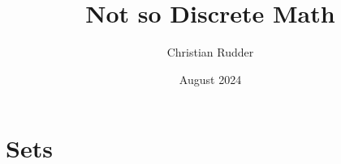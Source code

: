 \documentclass{article}
\title{Not so Discrete Math}
\author{Christian Rudder}
\date{August 2024}
\begin{document}
\maketitle

\section{Sets}



\end{document}
